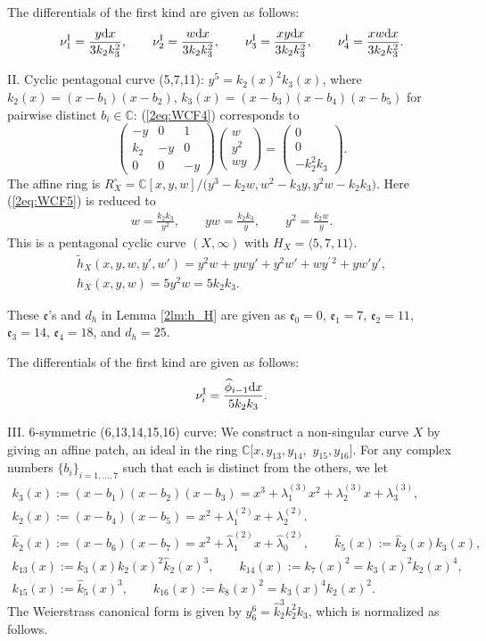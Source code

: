 \documentclass[pdftex]{sigma}
\def\CC{{\mathbb C}}
\def\fe{{\mathfrak e}}
\def\th{{\widetilde h}}
\def\hk{{\widehat k}}
\def\hlambda{{\widehat \lambda}}
\def\hphi{{\widehat \phi}}
\def\nuI#1{{\nu^{\mathrm{I}}_{#1}}}
\numberwithin{equation}{section}
\begin{document}
The differentials of the first kind are given as follows:
\[
\nuI{1}=\frac{y {\rm d} x}{3k_2k_3^2},\qquad
\nuI{2}=\frac{w {\rm d} x}{3k_2k_3^2},\qquad
\nuI{3}=\frac{xy {\rm d} x}{3k_2k_3^2},\qquad
\nuI{4}=\frac{xw {\rm d} x}{3k_2k_3^2}.
\]


II. Cyclic pentagonal curve (5,7,11):
$y^5 = k_2(x)^2 k_3(x)$, where
$k_2(x) = (x-b_1)(x-b_2)$,
$k_3(x) = (x-b_3)(x-b_4)(x-b_5)$ for pairwise distinct $b_i\in \CC$:
(\ref{2eq:WCF4}) corresponds to
\[
\begin{pmatrix}
-y & 0 & 1\\
k_2 & -y & 0\\
0 & 0 & - y
\end{pmatrix}
\begin{pmatrix}
w \\ y^2\\ wy
\end{pmatrix}
=\begin{pmatrix}
0 \\ 0\\ -k_2^2 k_3
\end{pmatrix}.
\]
The affine ring is
$R_X^\circ =\CC[x, y, w]/\big(y^3-k_2w, w^2-k_3y, y^2 w - k_2 k_3\big)$.
Here (\ref{2eq:WCF5}) is reduced to
\begin{gather*}
w = \frac{k_2 k_3}{y^2},\qquad
yw = \frac{k_2 k_3}{y},\qquad
y^2 = \frac{k_2 w}{y}.
\end{gather*}
This is a pentagonal cyclic curve $(X,\infty )$ with $H_X=\langle
5,7,11\rangle$.
\begin{gather*}
\th_X(x, y, w, y', w')=y^2 w + y w y' + y^2 w' + w y^{\prime\,2}+y w' y',\\
h_X(x,y, w) = 5 y^2 w =5k_2k_3.
\end{gather*}

These $\fe$'s and $d_h$ in Lemma \ref{2lm:h_H} are given as
$\fe_0 = 0$, $\fe_1 = 7$, $\fe_2 = 11$,
$\fe_3 = 14$, $\fe_4 = 18$, and $d_h = 25$.

The differentials of the first kind are given as follows:
\[
\nuI{i}=\frac{\hphi_{i-1} {\rm d} x}{5k_2k_3}.
\]

III. 6-symmetric (6,13,14,15,16) curve:
We construct a non-singular curve $X$ by giving an affine patch, an ideal in the ring $\CC[x, y_{13}, y_{14},$ $y_{15}, y_{16}]$.
For any complex numbers $\{b_i\}_{i=1, \dots, 7}$ such that each is distinct from the others, we let
\begin{gather*}
 k_3(x) := (x - b_1)(x - b_2)(x - b_3)
= x^3 + \lambda^{(3)}_{1} x^2 + \lambda^{(3)}_{2} x + \lambda^{(3)}_{3}, \\
 k_2(x) := (x - b_4) (x - b_5)
= x^2 + \lambda^{(2)}_{1} x + \lambda^{(2)}_{2} . \\
 \hk_{2}(x) := (x-b_6)(x-b_7)
 = x^2 + \hlambda^{(2)}_1 x + \hlambda^{(2)}_0, \qquad
 \hk_{5}(x) := \hk_{2}(x) k_{3}(x), \\
 k_{13}(x) := k_3(x)k_2(x)^2 \hk_2(x)^3, \qquad
 k_{14}(x) := k_7(x)^2 = k_3(x)^2k_2(x)^4 , \\
 k_{15}(x) := \hk_5(x)^3, \qquad k_{16}(x) := k_8(x)^2 = k_3(x)^4k_2(x)^2 .
\end{gather*}
The Weierstrass canonical form is given by $y_6^6=\hk_2^3k_2^2 k_3$, which is normalized as follows.
\end{document}
